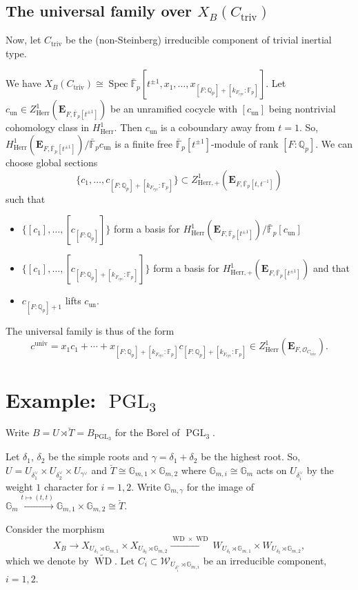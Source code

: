 \documentclass[11pt]{amsart}
\theoremstyle{definition}
\newcommand{\Q}{\mathbb{Q}}
\newcommand{\G}{\mathbb{G}}
\newcommand{\F}{\mathbb{F}}
\newcommand{\bfE}{\mathbf{E}}
\newcommand{\wt}[1]{\widetilde{#1}}
\newcommand{\bFp}{\bar{\mathbb{F}}_p}
\newcommand{\cO}{\mathcal{O}}
\newcommand{\cW}{\mathcal{W}}
\newcommand{\bT}{\breve{T}}
\newcommand{\univ}{{\operatorname{univ}}}
\newcommand{\cyc}{{\operatorname{cyc}}}
\newcommand{\dkF}{[k_{F_{\cyc}}:\F_p]}
\newcommand{\dF}{[F:\Q_p]}
\DeclareMathOperator{\PGL}{PGL}
\DeclareMathOperator{\triv}{triv}
\DeclareMathOperator{\un}{un}
\DeclareMathOperator{\WD}{WD}
\DeclareMathOperator{\Spec}{Spec}
\newcommand{\Herr}{\mathrm{Herr}}
\begin{document}
\subsection{The universal family
over $X_B(C_{\triv})$}
Now, let $C_{\triv}$ be the (non-Steinberg) irreducible component
of trivial inertial type.

We have
$X_B(C_{\triv})\cong \Spec \bFp[t^{\pm1}, x_1,\dots, x_{\dF+\dkF}]$.
Let $c_{\un}\in
Z^1_{\Herr}(\bfE_{F, \bFp[t^{\pm1}]})$
be an unramified cocycle
with $[c_{\un}]$ being nontrivial cohomology class
in $H^1_{\Herr}$.
Then $c_{\un}$ is a coboundary
away from $t=1$.
So,
$H^1_{\Herr}(\bfE_{F, \bFp[t^{\pm1}]})/
\bFp c_{\un}$
is a finite free $\bFp[t^{\pm1}]$-module
of rank $\dF$.
We can choose global sections
\[
\{c_1,\dots, c_{\dF+\dkF}\}
\subset 
Z^1_{\Herr,+}(\bfE_{F,\bFp[t,t^{-1}]})
\]
such that
\begin{itemize}
\item 
$\{[c_1], \dots, [c_{\dF}]\}$
form a basis for 
$H^1_{\Herr}(\bfE_{F, \bFp[t^{\pm1}]})/
\bFp[c_{\un}]$
\item
$\{[c_1], \dots, [c_{\dF+\dkF}]\}$
form a basis for 
$H^1_{\Herr,+}(\bfE_{F, \bFp[t^{\pm1}]})$
and that 
\item
$c_{\dF+1}$
lifts $c_{\un}$.
\end{itemize}
The universal family is thus of the form
\[
c^\univ=x_1 c_1 +\cdots + x_{\dF+\dkF}c_{\dF+\dkF}
\in Z^1_{\Herr}(\bfE_{F, \cO_{C_{\triv}}}).
\]



\section{Example: $\PGL_3$}

Write $B=U\rtimes \bT=B_{\PGL_3}$ for the Borel
of $\PGL_3$.

Let $\delta_1$, $\delta_2$ be the simple roots
and $\gamma=\delta_1+\delta_2$ be the highest root.
So, $U=U_{\delta_1^\vee}\times U_{\delta_2^\vee}\times U_{\gamma^\vee}$
and $\bT\cong \G_{m,1}\times \G_{m,2}$
where $\G_{m,i}\cong \G_m$
acts on $U_{\delta_i^\vee}$
by the weight $1$ character
for $i=1,2$.
Write $\G_{m, \gamma}$
for the image of
$\G_m\xrightarrow{t\mapsto(t,t)}\G_{m,1}\times \G_{m,2}\cong \bT$.

Consider the morphism
\[
X_{B}\to X_{U_{\delta_1}\rtimes \G_{m,1}}
\times X_{U_{\delta_2}\rtimes \G_{m,2}}
\xrightarrow{\WD\times\WD}
W_{U_{\delta_1}\rtimes \G_{m,1}}
\times W_{U_{\delta_2}\rtimes \G_{m,2}},
\]
which we denote by $\wt\WD$.
Let $C_i\subset \cW_{U_{\delta_i^\vee}\rtimes \G_{m,i}}$
be an irreducible component, $i=1,2$.
\end{document}
